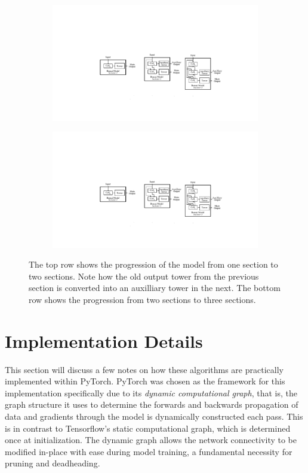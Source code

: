 \begin{figure}[ht!]
\begin{subfigure}{.5\textwidth}
  \centering
  \vspace*{-1.4cm}\includegraphics[width=.9\linewidth]{model2}
\end{subfigure}%
\begin{subfigure}{.5\textwidth}
  \centering
  \includegraphics[width=.9\linewidth]{model3}
\end{subfigure}
\caption[The progression of a model from one through three sections]{The top row shows the progression of the model from one section to two sections. Note how the old output tower from
the previous section is converted into an auxilliary tower in the next. The bottom row shows the progression from two sections
to three sections.}
\label{fig:bonsai_growth}
\end{figure}

\clearpage

\section{Implementation Details} \label{sect:bonsai_implementation_details}
This section will discuss a few notes on how these algorithms are practically implemented within PyTorch. PyTorch was chosen
as the framework for this implementation specifically due to its \textit{dynamic computational graph}, that is, the graph
structure it uses to determine the forwards and backwards propagation of data and gradients through the model is dynamically
constructed each pass. This is in contrast to Tensorflow's static computational graph, which is determined once at initialization.
The dynamic graph allows the network connectivity to be modified in-place with ease during model training, a fundamental
necessity for pruning and deadheading.

